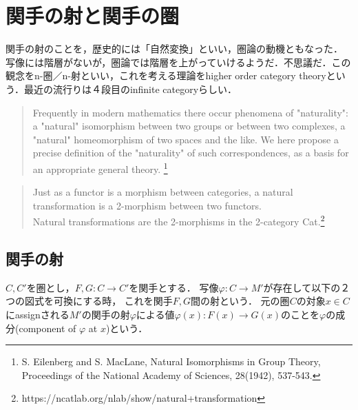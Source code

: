 \documentclass[uplatex, dvipdfmx]{jsreport}
\begin{document}
\chapter{関手の射と関手の圏}
関手の射のことを，歴史的には「自然変換」といい，圏論の動機ともなった．
写像には階層がないが，圏論では階層を上がっていけるようだ．不思議だ．この観念をn-圏／n-射といい，これを考える理論をhigher order category theoryという．最近の流行りは４段目のinfinite categoryらしい．
\begin{quote}
    Frequently in modern mathematics there occur phenomena of "naturality": a "natural" isomorphism between two groups or between two complexes, a "natural" homeomorphism of two spaces and the like. We here propose a precise definition of the "naturality" of such correspondences, as a basis for an appropriate general theory. \footnote{S. Eilenberg and S. MacLane, Natural Isomorphisms in Group Theory, Proceedings of the National Academy of Sciences, 28(1942), 537-543.}
\end{quote}
\begin{quote}
    Just as a functor is a morphism between categories, a natural transformation is a 2-morphism between two functors. \\ Natural transformations are the 2-morphisms in the 2-category Cat.\footnote{https://ncatlab.org/nlab/show/natural+transformation}
\end{quote}

\section{関手の射}

\begin{definition}[関手の射]
    $C,C'$を圏とし，$F,G:C\rightarrow C'$を関手とする．
    写像$\varphi : C\rightarrow M'$が存在して以下の２つの図式を可換にする時，
    これを関手$F,G$間の射という．
    元の圏$C$の対象$x\in C$にassignされる$M'$の関手の射$\varphi$による値$\varphi (x):F(x)\rightarrow G(x)$のことを$\varphi$の成分(component of $\varphi$ at $x$)という．
\end{definition}
\end{document}
